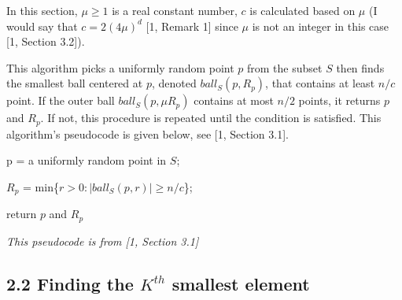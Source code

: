 \documentclass[12pt,english,]{article}
\let\origfigure\figure
\let\endorigfigure\endfigure
\renewenvironment{figure}[1][2] {
    \expandafter\origfigure\expandafter[H]
} {
    \endorigfigure
}
\begin{document}
In this section, \(\mu \ge1\) is a real constant number, \(c\) is
calculated based on \(\mu\) (I would say that \(c = 2(4\mu)^d\) {[}1,
Remark 1{]} since \(\mu\) is not an integer in this case {[}1, Section
3.2{]}).

This algorithm picks a uniformly random point \(p\) from the subset
\(S\) then finds the smallest ball centered at \(p\), denoted
\(ball_S(p, R_p)\), that contains at least \(n/c\) point. If the outer
ball \(ball_S(p,\mu R_p)\) contains at most \(n/2\) points, it returns
\(p\) and \(R_p\). If not, this procedure is repeated until the
condition is satisfied. This algorithm's pseudocode is given below, see
{[}1, Section 3.1{]}.

\begin{figure}[ht]
  \centering
  \begin{minipage}{0.9\linewidth}
    {\LinesNotNumbered
    \begin{algorithm}[H]

    \DontPrintSemicolon
    \SetAlgoLined
    \BlankLine

    \centering
    \begin{minipage}{.80\linewidth}
      {p = a uniformly random point in $S$;

      $R_p$ = min\{$r > 0: |ball_S(p, r)| \geq n/c$\};}
      return $p$ and $R_p$
    \end{minipage}
    \caption{\textsc{SparseSepAnn}$(S,n,d,t)$}
    \end{algorithm}}
  \end{minipage}
  \begin{minipage}{0.90\textwidth}
    \begin{flushright}
    {\footnotesize \emph{This pseudocode is from [1, Section 3.1]}\par}
    \end{flushright}
  \end{minipage}
\end{figure}

\hypertarget{finding-the-kth-smallest-element}{%
\subsection{\texorpdfstring{2.2 \enspace Finding the \(K^{th}\) smallest
element}{2.2 Finding the K\^{}\{th\} smallest element}}\label{finding-the-kth-smallest-element}}
\end{document}
